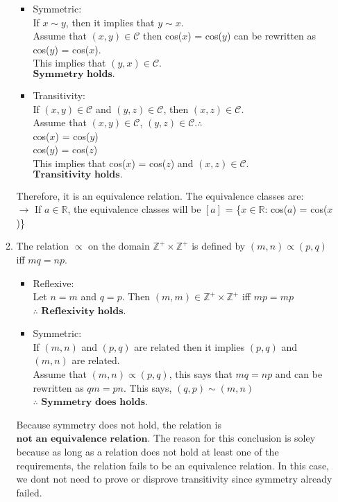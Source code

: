\documentclass{article}
\newcommand{\R}{\mathbb{R}}
\newcommand{\Z}{\mathbb{Z}}
\begin{document}
\begin{enumerate}
\begin{enumerate}
\begin{itemize}
        \item Symmetric:\\If $x \sim y$, then it implies that $y \sim x$.\\Assume that $(x,y) \in 
        \mathcal{C}$ then cos($x$) = cos($y$) can be rewritten as cos($y$) = cos($x$).\\This implies 
        that $(y,x) \in \mathcal{C}$.\\$\textbf{Symmetry holds.}$\\ 

        \item Transitivity:\\If $(x,y) \in \mathcal{C}$ and $(y,z) \in \mathcal{C}$, then $(x,z) \in \mathcal{C}$.\\
        Assume that $(x,y) \in \mathcal{C}$, $(y,z) \in \mathcal{C}$.$\therefore$\\
        cos($x$) = cos($y$)\\
        cos($y$) = cos($z$)\\
        This implies that cos($x$) = cos($z$) and $(x,z) \in \mathcal{C}$.\\$\textbf{Transitivity holds.}$\\
    \end{itemize}
    Therefore, it is an equivalence relation. The equivalence classes are:\\
    $\rightarrow$ If $a \in \R$, the equivalence classes will be $[a]$ = \{$x \in \R$: cos($a$) = cos($x$)\}\\

    \item The relation $\varpropto$ on the domain $\Z^+\times\Z^+$ is defined by $(m,n) \varpropto (p,q)$ iff $mq = np$.
    \begin{itemize}
        \item Reflexive:\\Let $n = m$ and $q = p$. Then $(m,m) \in \Z^+\times\Z^+$ iff $mp = mp$\\$\therefore$ $\textbf{Reflexivity holds.}$\\
        \item Symmetric:\\If $(m,n)$ and $(p,q)$ are related then it implies $(p,q)$ and $(m,n)$ are related.\\Assume that $(m,n) \varpropto (p,q)$,
        this says that $mq = np$ and can be rewritten as $qm = pn$. This says, $(q,p) \sim (m,n)$\\$\therefore$ $\textbf{Symmetry does holds.}$
    \end{itemize}

    Because symmetry does not hold, the relation is $\textbf{not an equivalence relation.}$ The reason for this conclusion is soley
    because as long as a relation does not hold at least one of the requirements, the relation fails to be an equivalence relation. In this case,
    we dont not need to prove or disprove transitivity since symmetry already failed.
\end{enumerate}

\end{enumerate}
\end{document}
